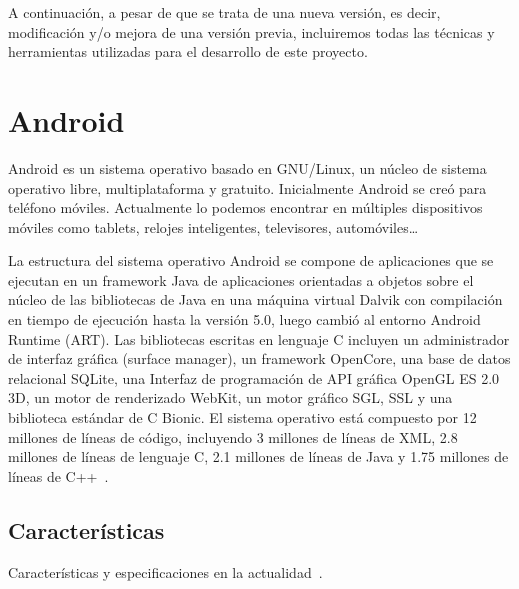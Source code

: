 A continuación, a pesar de que se trata de una nueva versión, es decir, modificación y/o mejora de una versión previa, incluiremos todas las técnicas y herramientas utilizadas para el desarrollo de este proyecto.
\section{Android}
Android es un sistema operativo basado en GNU/Linux, un núcleo de sistema operativo libre, multiplataforma y gratuito.
Inicialmente Android se creó para teléfono móviles. Actualmente lo podemos encontrar en múltiples dispositivos móviles como tablets, relojes inteligentes, televisores, automóviles…

La estructura del sistema operativo Android se compone de aplicaciones que se ejecutan en un framework Java de aplicaciones orientadas a objetos sobre el núcleo de las bibliotecas de Java en una máquina virtual Dalvik con compilación en tiempo de ejecución hasta la versión 5.0, luego cambió al entorno Android Runtime (ART).
Las bibliotecas escritas en lenguaje C incluyen un administrador de interfaz gráfica (surface manager), un framework OpenCore, una base de datos relacional SQLite, una Interfaz de programación de API gráfica OpenGL ES 2.0 3D, un motor de renderizado WebKit, un motor gráfico SGL, SSL y una biblioteca estándar de C Bionic. El sistema operativo está compuesto por 12 millones de líneas de código, incluyendo 3 millones de líneas de XML, 2.8 millones de líneas de lenguaje C, 2.1 millones de líneas de Java y 1.75 millones de líneas de C++~\cite{wiki:android}.

\subsection{Características}
Características y especificaciones en la actualidad~\cite{wiki:android}.

